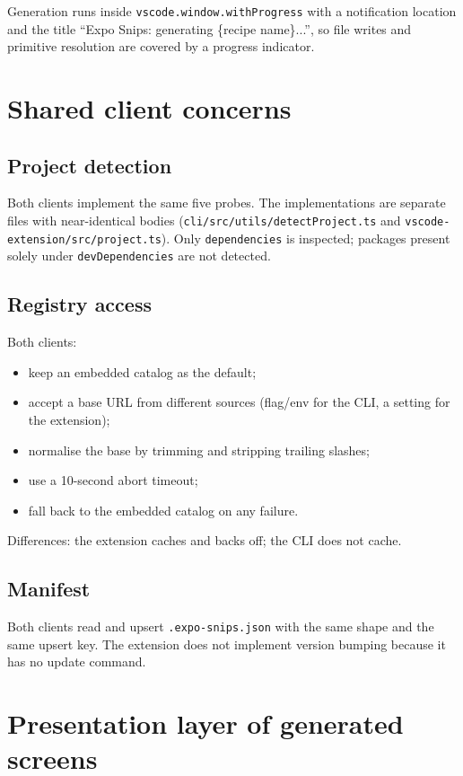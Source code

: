 Generation runs inside \texttt{vscode.window.withProgress} with a notification
location and the title ``Expo Snips: generating \{recipe name\}...'', so file writes
and primitive resolution are covered by a progress indicator.

\section{Shared client concerns}

\subsection*{Project detection}

Both clients implement the same five probes. The implementations are separate
files with near-identical bodies (\texttt{cli/src/utils/detectProject.ts} and
\texttt{vscode-extension/src/project.ts}). Only \texttt{dependencies} is inspected;
packages present solely under \texttt{devDependencies} are not detected.

\subsection*{Registry access}

Both clients:
\begin{itemize}
  \item keep an embedded catalog as the default;
  \item accept a base URL from different sources (flag/env for the CLI, a setting
        for the extension);
  \item normalise the base by trimming and stripping trailing slashes;
  \item use a 10-second abort timeout;
  \item fall back to the embedded catalog on any failure.
\end{itemize}

Differences: the extension caches and backs off; the CLI does not cache.

\subsection*{Manifest}

Both clients read and upsert \texttt{.expo-snips.json} with the same shape and the
same upsert key. The extension does not implement version bumping because it has
no update command.

\section{Presentation layer of generated screens}

